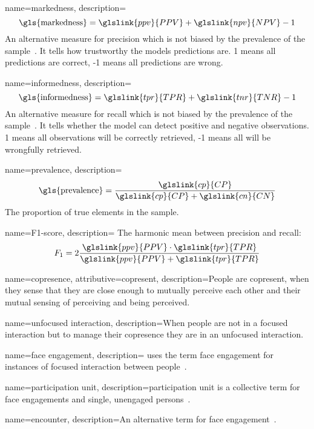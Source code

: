{
	name={markedness},
	description={
		\[\text{\gls{markedness}} = \glslink{ppv}{PPV}+\glslink{npv}{NPV}-1\]
		An alternative measure for \gls{precision} which is not biased by the \gls{prevalence} of the sample~\cite[]{powers2008}. It tells how trustworthy the models predictions are. 1 means all predictions are correct, -1 means all predictions are wrong.
	}
}

{
	name={informedness},
	description={
		\[\text{\gls{informedness}} = \glslink{tpr}{TPR}+\glslink{tnr}{TNR}-1\]
		An alternative measure for \gls{recall} which is not biased by the \gls{prevalence} of the sample~\cite[]{powers2008}. It tells whether the model can detect positive and negative observations. 1 means all observations will be correctly retrieved, -1 means all will be wrongfully retrieved.
	}
}

{
	name={prevalence},
	description={
		\[\text{\gls{prevalence}} = \frac{\glslink{cp}{CP}}{\glslink{cp}{CP}+\glslink{cn}{CN}}\]
		The proportion of true elements in the sample.
	}
}

{
	name={{F1-score}},
	description={
		The harmonic mean between \gls{precision} and \gls{recall}:
		\[F_1=2\frac{\glslink{ppv}{PPV}\cdot\glslink{tpr}{TPR}}{\glslink{ppv}{PPV}+\glslink{tpr}{TPR}}\]
	}
}

{
	name={copresence},
	attributive={copresent},
	description={People are copresent, when they sense that they are close enough to mutually perceive each other and their mutual sensing of perceiving and being perceived.}
}

{
	name={unfocused interaction},
	description={When people are not in a \gls{focused interaction} but to manage their \gls{copresence} they are in an \gls{unfocused interaction}.}
}

{
	name={face engagement},
	description={\citeauthor{goffman1963} uses the term \gls{face engagement} for instances of \gls{focused interaction} between people~\cite[p. 91]{goffman1963}.}
}

{
	name={participation unit},
	description={\Gls{participation unit} is a collective term for \glspl{face engagement} and single, unengaged persons~\cite[p. 91]{goffman1963}.}
}

{
	name={encounter},
	description={An alternative term for \gls{face engagement}~\cite[]{goffman1963}.}
}

